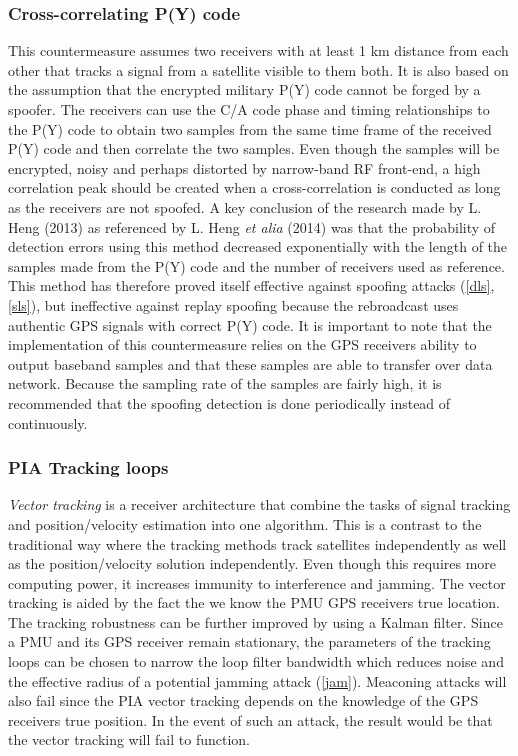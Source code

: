 \documentclass[12pt,english,a4paper]{article}
\begin{document}
\subsubsection{Cross-correlating P(Y) code}\label{ccpc} %
This countermeasure assumes two receivers with at least 1 km distance from each other that tracks a signal from a satellite visible to them both. It is also based on the assumption that the encrypted military P(Y) code cannot be forged by a spoofer. The receivers can use the C/A code phase and timing relationships to the P(Y) code to obtain two samples from the same time frame of the received P(Y) code and then correlate the two samples. Even though the samples will be encrypted, noisy and perhaps distorted by narrow-band RF front-end, a high correlation peak should be created when a cross-correlation is conducted as long as the receivers are not spoofed. A key conclusion of the research made by L. Heng (2013) as referenced by L. Heng \textit{et alia} (2014) was that the probability of detection errors using this method decreased exponentially with the length of the samples made from the P(Y) code and the number of receivers used as reference. This method has therefore proved itself effective against spoofing attacks (\ref{dls},\ref{sls}), but ineffective against replay spoofing because the rebroadcast uses authentic GPS signals with correct P(Y) code. It is important to note that the implementation of this countermeasure relies on the GPS receivers ability to output baseband samples and that these samples are able to transfer over data network. Because the sampling rate of the samples are fairly high, it is recommended that the spoofing detection is done periodically instead of continuously. \cite{HengChouGao14}  

\subsubsection{PIA Tracking loops}\label{ptl} %
\textit{Vector tracking} is a receiver architecture that combine the tasks of signal tracking and position/velocity estimation into one algorithm. This is a contrast to the traditional way where the tracking methods track satellites independently as well as the position/velocity solution independently. Even though this requires more computing power, it increases immunity to interference and jamming. The vector tracking is aided by the fact the we know the PMU GPS receivers true location. The tracking robustness can be further improved by using a Kalman filter. Since a PMU and its GPS receiver remain stationary, the parameters of the tracking loops can be chosen to narrow the loop filter bandwidth which reduces noise and the effective radius of a potential jamming attack (\ref{jam}). Meaconing attacks will also fail since the PIA vector tracking depends on the knowledge of the GPS receivers true position. In the event of such an attack, the result would be that the vector tracking will fail to function. \cite{HengChouGao14}  
\end{document}
